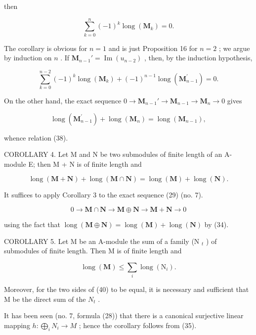 then

\[
\sum_ {k = 0} ^ {n} (- 1) ^ {k} \operatorname{long} (\mathbf {M} _ {k}) = 0.\tag{38}
\]

The corollary is obvious for \(n = 1\) and is just Proposition 16 for \(n = 2\) ; we argue by induction on \(n\) . If \(\mathbf{M}_{n-1}' = \operatorname{Im}(u_{n-2})\) , then, by the induction hypothesis,

\[
\sum_ {k = 0} ^ {n - 2} (- 1) ^ {k} \operatorname{long} (\mathbf {M} _ {k}) + (- 1) ^ {n - 1} \operatorname{long} (\mathbf {M} _ {n - 1} ^ {\prime}) = 0.
\]

On the other hand, the exact sequence \(0 \to \mathbf{M}_{n-1}' \to \mathbf{M}_{n-1} \to \mathbf{M}_n \to 0\) gives

\[
\operatorname{long} \left(\mathbf {M} _ {n - 1} ^ {\prime}\right) + \operatorname{long} \left(\mathbf {M} _ {n}\right) = \operatorname{long} \left(\mathbf {M} _ {n - 1}\right),
\]

whence relation (38).

COROLLARY 4. Let M and N be two submodules of finite length of an A-module E; then M + N is of finite length and

\[
\operatorname{long} (\mathbf {M} + \mathbf {N}) + \operatorname{long} (\mathbf {M} \cap \mathbf {N}) = \operatorname{long} (\mathbf {M}) + \operatorname{long} (\mathbf {N}).\tag{39}
\]

It suffices to apply Corollary 3 to the exact sequence (29) (no. 7).

\[
0 \rightarrow \mathbf {M} \cap \mathbf {N} \rightarrow \mathbf {M} \oplus \mathbf {N} \rightarrow \mathbf {M} + \mathbf {N} \rightarrow 0
\]

using the fact that \(\operatorname{long}(\mathbf{M} \oplus \mathbf{N}) = \operatorname{long}(\mathbf{M}) + \operatorname{long}(\mathbf{N})\) by (34).

COROLLARY 5. Let M be an A-module the sum of a family (N \(_{t}\) ) of submodules of finite length. Then M is of finite length and

\[
\operatorname{long} (\mathbf {M}) \leqslant \sum_ {i} \operatorname{long} \left(\mathrm{N} _ {i}\right).\tag{40}
\]

Moreover, for the two sides of (40) to be equal, it is necessary and sufficient that M be the direct sum of the \(N_{t}\) .

It has been seen (no. 7, formula (28)) that there is a canonical surjective linear mapping \(h \colon \bigoplus_{i} N_{i} \to M\) ; hence the corollary follows from (35).

